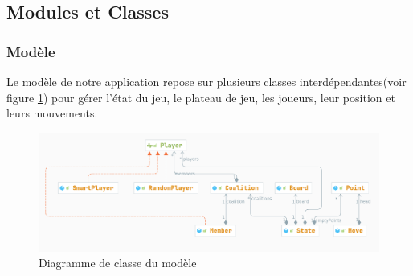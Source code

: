 \subsection{Modules et Classes}
\subsubsection{Modèle}
Le modèle de notre application repose sur  plusieurs classes interdépendantes(voir figure \ref{fig:modele}) pour gérer l'état du jeu,
le plateau de jeu, les joueurs, leur position et leurs mouvements.
\begin{figure}[ht!]
	\centering
	\includegraphics[scale=0.25]{diagrames/model}
	\caption{Diagramme de classe du modèle}
	\label{fig:modele}
\end{figure}\\


